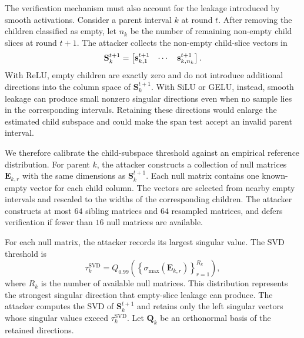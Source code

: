 The verification mechanism must also account for the leakage introduced by
smooth activations. Consider a parent interval $k$ at round $t$. After removing
the children classified as empty, let $n_k$ be the number of remaining
non-empty child slices at round $t+1$. The attacker collects the non-empty child-slice
vectors in
\begin{equation}
\mathbf{S}_k^{t+1}
=
\begin{bmatrix}
\mathbf{s}_{k,1}^{t+1}
&
\cdots
&
\mathbf{s}_{k,n_k}^{t+1}
\end{bmatrix}.
\end{equation}
With ReLU, empty children are exactly zero and do not introduce additional
directions into the column space of $\mathbf{S}_k^{t+1}$. With SiLU or GELU,
instead, smooth leakage can produce small nonzero singular directions even
when no sample lies in the corresponding intervals. Retaining these directions
would enlarge the estimated child subspace and could make the span test accept
an invalid parent interval.

We therefore calibrate the child-subspace threshold against an empirical reference distribution. For parent $k$, the attacker constructs a collection of null matrices
$\mathbf{E}_{k,r}$ with the same dimensions as $\mathbf{S}_k^{t+1}$. Each null
matrix contains one known-empty vector for each child column. The vectors are
selected from nearby empty intervals and rescaled to the widths of the
corresponding children. The attacker
constructs at most $64$ sibling matrices and $64$ resampled matrices, and
defers verification if fewer than $16$ null matrices are available.

For each null matrix, the attacker records its largest singular value. The SVD
threshold is
\begin{equation}
\tau_k^{\mathrm{SVD}}
=
Q_{0.99}
\left(
\left\{
\sigma_{\max}\!\left(\mathbf{E}_{k,r}\right)
\right\}_{r=1}^{R_k}
\right),
\end{equation}
where $R_k$ is the number of available null matrices. This distribution
represents the strongest singular direction that empty-slice leakage can
produce. The attacker computes the SVD of $\mathbf{S}_k^{t+1}$ and retains
only the left singular vectors whose singular values exceed
$\tau_k^{\mathrm{SVD}}$.
Let $\mathbf{Q}_k$ be an orthonormal basis of the retained directions.

